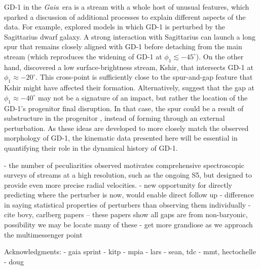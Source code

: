 \documentclass[twocolumn]{aastex63}
\newcommand{\gaia}{\textsl{Gaia}}
\begin{document}
GD-1 in the \gaia\ era is a stream with a whole host of unusual features, which sparked a discussion of additional processes to explain different aspects of the data.
For example, \citet{deboer2019} explored models in which GD-1 is perturbed by the Sagittarius dwarf galaxy.
A strong interaction with Sagittarius can launch a long spur that remains closely aligned with GD-1 before detaching from the main stream (which reproduces the widening of GD-1 at $\phi_1\lesssim-45^\circ$).
On the other hand, \citet{malhan2019c} discovered a low surface-brightness stream, Kshir, that intersects GD-1 at $\phi_1\approx-20^\circ$.
This cross-point is sufficiently close to the spur-and-gap feature that Kshir might have affected their formation.
Alternatively, \citet{webb2019} suggest that the gap at $\phi_1\approx-40^\circ$ may not be a signature of an impact, but rather the location of the GD-1's progenitor final disruption.
In that case, the spur could be a result of substructure in the progenitor \citep[e.g.,][]{carlberg2018}, instead of forming through an external perturbation.
As these ideas are developed to more closely match the observed morphology of GD-1, the kinematic data presented here will be essential in quantifying their role in the dynamical history of GD-1.

- the number of peculiarities observed \citep{pwb, bonaca2019b, bonaca2020} motivates comprehensive spectroscopic surveys of streams at a high resolution, such as the ongoing S5, but designed to provide even more precise radial velocities.
- new opportunity for directly predicting where the perturber is now, would enable direct follow up
- difference in saying statistical properties of perturbers than observing them individually
- cite bovy, carlberg papers -- these papers show all gaps are from non-baryonic, possibility we may be locate many of these
- get more grandiose as we approach the multimessenger point


Acknowledgments: 
- gaia sprint
- kitp
- mpia
- lars
- sean, tdc
- mmt, hectochelle
- doug



\end{document}
